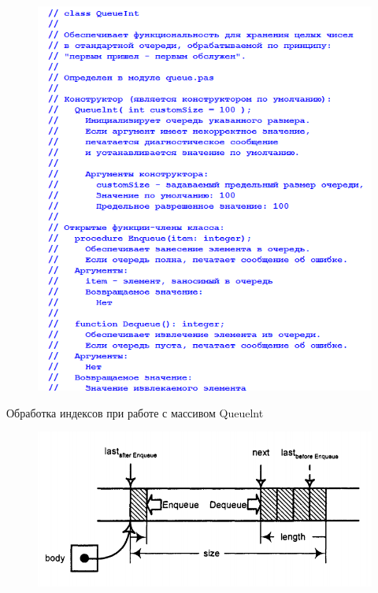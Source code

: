 \documentclass{beamer}
\begin{document}
\begin{frame}
\begin{figure}[h]
\centering
\includegraphics[scale=0.5]{images/lec05-pic06.png}
\end{figure}
\end{frame}

\begin{frame}{Обработка индексов при работе с массивом Queuelnt}
\begin{figure}[h]
\centering
\includegraphics[scale=0.5]{images/lec05-pic07.png}
\end{figure}
\end{frame}
\end{document}
